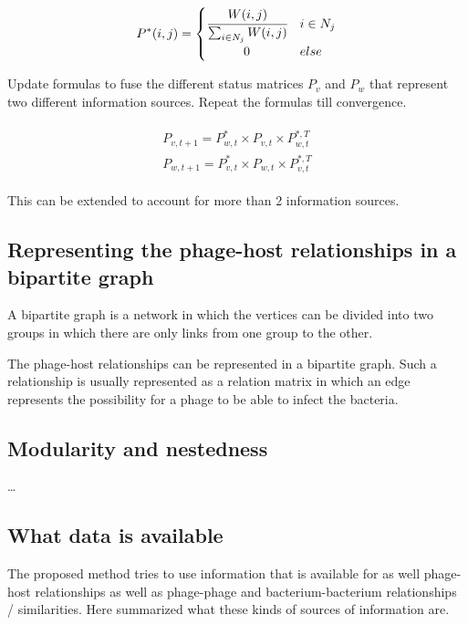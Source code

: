\documentclass{article}
\begin{document}
\begin{equation}
    P^*(i, j) = 
    \begin{cases}
        \cfrac{W(i, j)}{\sum_{i \in N_j}W(i, j)} & i \in N_j \\
        \hfil 0 & else
    \end{cases}
\end{equation} 

Update formulas to fuse the different status matrices $P_v$ and $P_w$ that 
represent two different information sources. Repeat the formulas till 
convergence.

\begin{align}
    \begin{split}
        P_{v, t+1} = P^*_{w, t} \times P_{v, t} \times P^{*,T}_{w, t} \\
        P_{w, t+1} = P^*_{v, t} \times P_{w, t} \times P^{*,T}_{v, t}
    \end{split}
\end{align}

This can be extended to account for more than 2 information sources.

\subsection{Representing the phage-host relationships in a bipartite graph}

A bipartite graph is a network in which the vertices can be divided into two 
groups in which there are only links from one group to the other. 

The phage-host relationships can be represented in a bipartite graph. 
Such a relationship is usually represented as a relation matrix in which 
an edge represents the possibility for a phage to be able to infect the 
bacteria.

\subsection{Modularity and nestedness}

\ldots

\subsection{What data is available}

The proposed method tries to use information that is available for as well
phage-host relationships as well as phage-phage and bacterium-bacterium
relationships / similarities. Here summarized what these kinds of sources
of information are.
\end{document}
